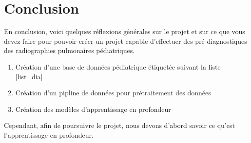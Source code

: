     \section*{Conclusion}
    En conclusion, voici quelques réflexions générales sur le projet et sur ce que vous devez faire pour pouvoir créer un projet capable d'effectuer  des pré-diagnostiques des radiographies pulmonaires pédiatriques.
    \begin{enumerate}
        \item Création d'une base de données pédiatrique étiquetée suivant la liste \ref{list_dia}
        \item Création d'un pipline de données pour prétraitement des données
        \item Création des modèles d'apprentissage en profondeur
    \end{enumerate}
    Cependant, afin de poursuivre le projet, nous devons d'abord savoir ce qu'est  l'apprentissage en profondeur.